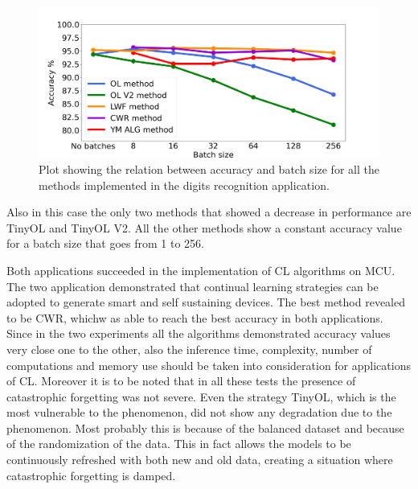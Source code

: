 \documentclass[12pt]{report}
\begin{document}
\begin{figure}[h!]
    \centering
    \includegraphics[width=140mm]{Figures/Chapter5/batch_size_openmv.png} 
    \caption{Plot showing the relation between accuracy and batch size for all the methods implemented in the digits recognition application.}
    \label{fig:openmv_batch_size}    
\end{figure}

Also in this case the only two methods that showed a decrease in performance are TinyOL and TinyOL V2. All the other methods show a constant accuracy value for a batch size that goes from 1 to 256.
\bigskip

Both applications succeeded in the implementation of CL algorithms on MCU. The two application demonstrated that continual learning strategies can be adopted to generate smart and self sustaining devices. The best method revealed to be CWR, whichw as able to reach the best accuracy in both applications. Since in the two experiments all the algorithms demonstrated accuracy values very close one to the other, also the inference time, complexity, number of computations and memory use should be taken into consideration for applications of CL. Moreover it is to be noted that in all these tests the presence of catastrophic forgetting was not severe. Even the strategy TinyOL, which is the most vulnerable to the phenomenon, did not show any degradation due to the phenomenon. Most probably this is because of the balanced dataset and because of the randomization of the data. This in fact allows the models to be continuously refreshed with both new and old data, creating a situation where catastrophic forgetting is damped.
\end{document}

